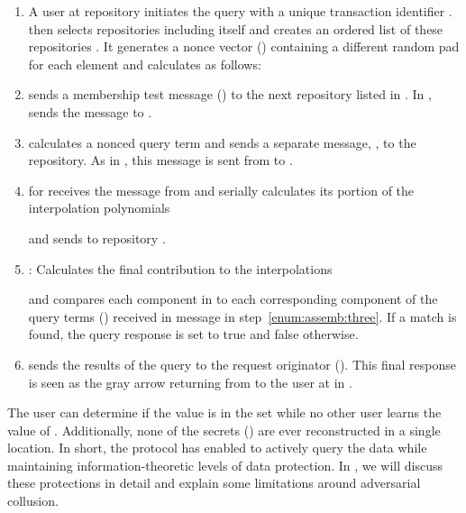 \begin{enumerate}
\item\label{enum:assemb:one} A user at repository  initiates the
  query with a unique transaction identifier .    then
  selects  repositories including itself and creates an ordered list of these
  repositories .  It generates a nonce
  vector () containing a different random pad for each element
	and calculates  as
  follows: 

\item\label{enum:assemb:two}   sends a membership test
  message () to the next repository listed in .
	In ,  sends the message to .
	

\item\label{enum:assemb:three}   calculates a nonced query
  term  and sends a separate message, , to the  repository.
	As  in , this message is sent from  to .






\item\label{enum:assemb:five}   for  receives the message from  and
   serially calculates its portion of  the interpolation
   polynomials
   
   and sends  to repository .

\item\label{enum:assemb:six}  : Calculates the final
  contribution to the interpolations
  
  and compares each component in  to each corresponding
  component of the query terms () received in message  in step~\ref{enum:assemb:three}. 
	If a match is found, the query response is set to true and false otherwise.

\item\label{enum:assemb:seven}   sends the results of the query to the 
	request originator  (). This final response is 
	seen as the gray arrow returning from  to the user at  in .
\end{enumerate}

The user  can determine if the value 
is in the set while no other user learns the value of . Additionally,
none of the secrets () are ever reconstructed in a
single location. 
In short, the \SIF protocol has
enabled  to actively query the data while maintaining
information-theoretic levels of data
protection. In , we will discuss these
protections in detail and explain some limitations around adversarial
collusion.
